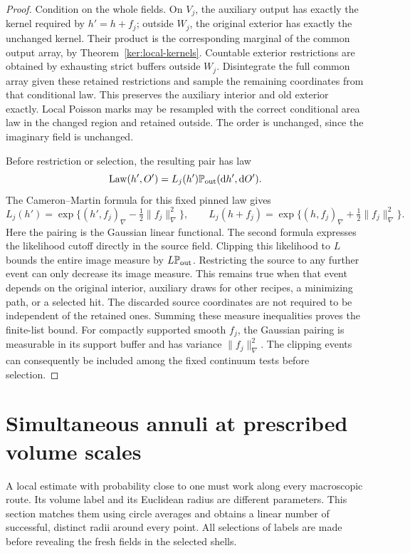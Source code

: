 \documentclass[11pt]{article}
\numberwithin{equation}{section}
\theoremstyle{definition}
\theoremstyle{remark}
\newcommand{\PP}{\mathbb P}
\newcommand{\dd}{\mathrm d}
\newcommand{\1}{\mathbf 1}
\DeclareMathOperator{\Law}{Law}
\begin{document}
\begin{proof}
Condition on the whole fields.  On \(V_j\), the auxiliary output
has exactly the kernel required by \(h'=h+f_j\); outside \(W_j\),
the original exterior has exactly the unchanged kernel.  Their
product is the corresponding marginal of the common output array,
by Theorem~\ref{ker:local-kernels}.  Countable exterior restrictions
are obtained by exhausting strict buffers outside \(W_j\).
Disintegrate the full common array given these retained restrictions
and sample the remaining coordinates from that conditional law.
This preserves the auxiliary interior and old exterior exactly.
Local Poisson marks may be resampled with the correct conditional
area law in the changed region and retained outside.  The order is
unchanged, since the imaginary field is unchanged.

Before restriction or selection, the resulting pair has law
\[
 \Law(h',O')=L_j(h')\PP_{\rm out}(\dd h',\dd O').
\]
The Cameron--Martin formula for this fixed pinned law gives
\[
 L_j(h')=\exp\{(h',f_j)_\nabla-\tfrac12\|f_j\|_\nabla^2\},
 \qquad
 L_j(h+f_j)=\exp\{(h,f_j)_\nabla+\tfrac12\|f_j\|_\nabla^2\}.
\]
Here the pairing is the Gaussian linear functional. The second formula
expresses the likelihood cutoff directly in the source field. Clipping
this likelihood to \(L\) bounds the entire image measure by
\(L\PP_{\rm out}\).  Restricting the source to any further event
can only decrease its image measure.  This remains true when that
event depends on the original interior, auxiliary draws for other
recipes, a minimizing path, or a selected hit.  The discarded source
coordinates are not required to be independent of the retained ones.
Summing these measure inequalities proves the finite-list bound.
For compactly supported smooth \(f_j\), the Gaussian pairing is
measurable in its support buffer and has variance
\(\|f_j\|_\nabla^2\).  The clipping events can consequently be
included among the fixed continuum tests before selection.
\end{proof}

\section{Simultaneous annuli at prescribed volume scales}
\label{ann:section}

A local estimate with probability close to one must work along every
macroscopic route.  Its volume label and its Euclidean radius are
different parameters.  This section matches them using circle averages
and obtains a linear number of successful, distinct radii around every
point.  All selections of labels are made before revealing the fresh
fields in the selected shells.
\end{document}
